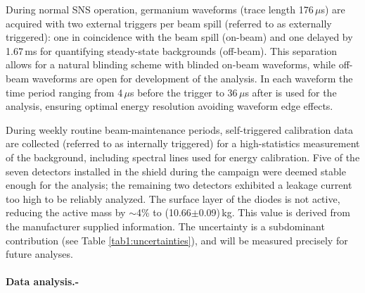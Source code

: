 \documentclass[aps,prltightenlines,superscriptaddress,nofootinbib,amsmath,amssymb,reprint]{revtex4-2}
\begin{document}
During normal SNS operation, germanium waveforms (trace length 176\,$\mu$s) are acquired with two external triggers per beam spill (referred to as externally triggered): 
one in coincidence with the beam spill (on-beam) and one delayed by 1.67\,ms for quantifying steady-state backgrounds (off-beam). This separation allows for a natural blinding scheme with blinded on-beam waveforms, while off-beam waveforms are open for development of the analysis. 
In each waveform the time period ranging from 4\,$\mu$s before the trigger to 36\,$\mu$s after is used for the analysis, ensuring optimal energy resolution avoiding waveform edge effects.


During weekly routine beam-maintenance periods, self-triggered calibration data are collected (referred to as internally triggered) for a high-statistics measurement of the background, including spectral lines used for energy calibration. Five of the seven detectors installed in the shield during the campaign were deemed stable enough for the analysis; the  remaining two detectors exhibited a leakage current too high to be reliably analyzed. The surface layer of the diodes is not active, reducing the active mass by $\sim$4\% to (10.66$\pm$0.09)\,kg. This value is derived from the manufacturer supplied information. The uncertainty is a subdominant contribution (see Table \ref{tab1:uncertainties}), and will be measured precisely for future analyses.


\paragraph*{Data analysis.-}
\end{document}
